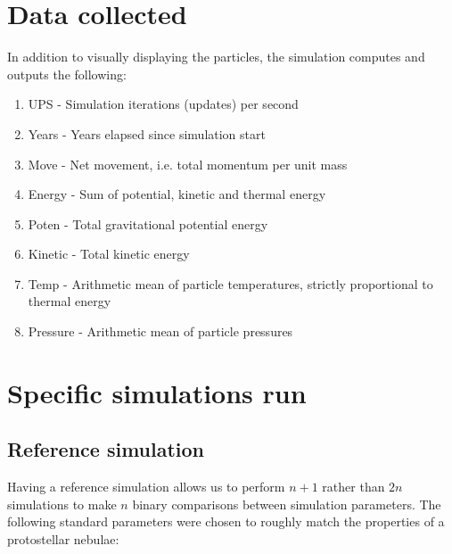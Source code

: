 \documentclass[../main.tex]{subfiles}
\begin{document}
\section{Data collected}
In addition to visually displaying the particles, the simulation computes and outputs the following:
\begin{enumerate}
    \item UPS - Simulation iterations (updates) per second
    \item Years - Years elapsed since simulation start
    \item Move - Net movement, i.e. total momentum per unit mass
    \item Energy - Sum of potential, kinetic and thermal energy
    \item Poten - Total gravitational potential energy
    \item Kinetic - Total kinetic energy
    \item Temp - Arithmetic mean of particle temperatures, strictly proportional to thermal energy
    \item Pressure - Arithmetic mean of particle pressures
\end{enumerate}

\section{Specific simulations run}

\subsection{Reference simulation}
Having a reference simulation allows us to perform $n+1$ rather than $2n$ simulations to make $n$
binary comparisons between simulation parameters. The following standard parameters were chosen to
roughly match the properties of a protostellar nebulae:
\\
\end{document}
